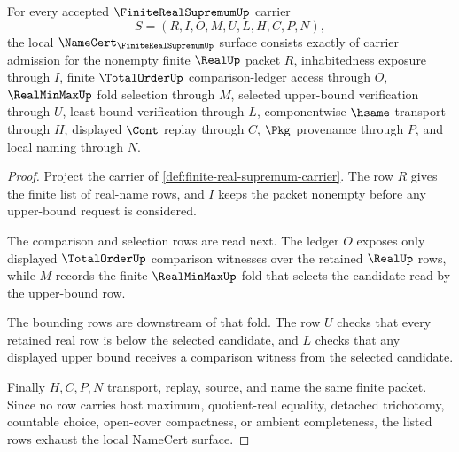 \begin{theorem}
\label{thm:finite-real-supremum-namecert-obligations}
For every accepted $\FiniteRealSupremumUp$ carrier
$$
S=(R,I,O,M,U,L,H,C,P,N),
$$
the local $\NameCert_{\FiniteRealSupremumUp}$ surface consists exactly of carrier admission for the nonempty finite $\RealUp$ packet $R$, inhabitedness exposure through $I$, finite $\TotalOrderUp$ comparison-ledger access through $O$, $\RealMinMaxUp$ fold selection through $M$, selected upper-bound verification through $U$, least-bound verification through $L$, componentwise $\hsame$ transport through $H$, displayed $\Cont$ replay through $C$, $\Pkg$ provenance through $P$, and local naming through $N$.
\end{theorem}
\begin{proof}
Project the carrier of \autoref{def:finite-real-supremum-carrier}. The row $R$ gives the finite list of real-name rows, and $I$ keeps the packet nonempty before any upper-bound request is considered.

The comparison and selection rows are read next. The ledger $O$ exposes only displayed $\TotalOrderUp$ comparison witnesses over the retained $\RealUp$ rows, while $M$ records the finite $\RealMinMaxUp$ fold that selects the candidate read by the upper-bound row.

The bounding rows are downstream of that fold. The row $U$ checks that every retained real row is below the selected candidate, and $L$ checks that any displayed upper bound receives a comparison witness from the selected candidate.

Finally $H,C,P,N$ transport, replay, source, and name the same finite packet. Since no row carries host maximum, quotient-real equality, detached trichotomy, countable choice, open-cover compactness, or ambient completeness, the listed rows exhaust the local NameCert surface.
\end{proof}



